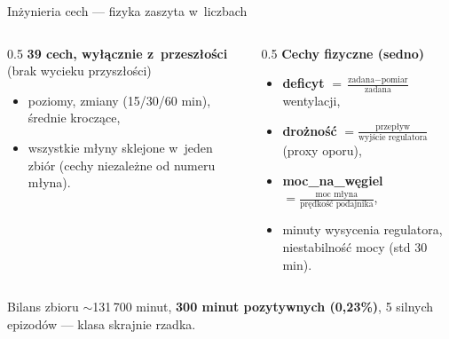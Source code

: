 \documentclass[aspectratio=169,11pt]{beamer}
\newcommand{\sig}[1]{\textcolor{akcent}{\textbf{#1}}}
\begin{document}
\begin{frame}{Inżynieria cech --- fizyka zaszyta w~liczbach}
  \begin{columns}[T]
    \begin{column}{0.5\textwidth}
      \textbf{39 cech, wyłącznie z~przeszłości} (brak wycieku przyszłości)
      \begin{itemize}\footnotesize
        \item poziomy, zmiany (15/30/60 min), średnie kroczące,
        \item wszystkie młyny sklejone w~jeden zbiór (cechy niezależne od numeru młyna).
      \end{itemize}
    \end{column}
    \begin{column}{0.5\textwidth}
      \textbf{Cechy fizyczne (sedno)}
      \begin{itemize}\footnotesize
        \item \sig{deficyt} $=\frac{\text{zadana}-\text{pomiar}}{\text{zadana}}$ wentylacji,
        \item \sig{drożność} $=\frac{\text{przepływ}}{\text{wyjście regulatora}}$ (proxy oporu),
        \item \sig{moc\_na\_węgiel} $=\frac{\text{moc młyna}}{\text{prędkość podajnika}}$,
        \item minuty wysycenia regulatora, niestabilność mocy (std 30 min).
      \end{itemize}
    \end{column}
  \end{columns}
  \vspace{0.5em}
  \begin{block}{Bilans zbioru}
    \footnotesize $\sim$131\,700 minut, \sig{300 minut pozytywnych (0,23\%)}, 5 silnych epizodów --- klasa skrajnie rzadka.
  \end{block}
\end{frame}
\end{document}

